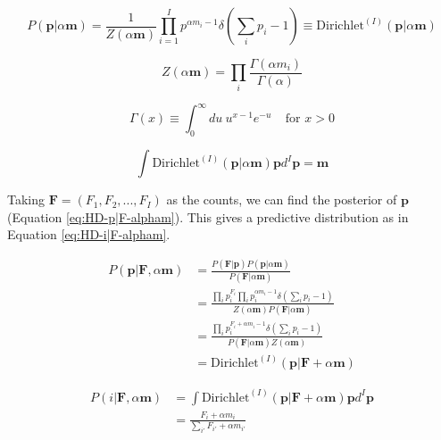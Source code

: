 \begin{equation}
P(\boldsymbol{p}|\alpha\boldsymbol{m})=\frac{1}{Z(\alpha\boldsymbol{m})}\prod_{i=1}^{I}p^{\alpha m_{i}-1}\delta\left(\sum_{i}p_{i}-1\right)\equiv \text{Dirichlet}^{(I)}(\boldsymbol{p}|\alpha\boldsymbol{m})
\label{eq:HD-Dir-p|alpha-m}
\end{equation}

\begin{equation}
Z(\alpha\boldsymbol{m})=\prod_{i}\frac{\Gamma(\alpha m_{i})}{\Gamma(\alpha)}
\label{eq:HD-Z}
\end{equation}

\begin{equation}
\Gamma(x)\equiv\int_{0}^{\infty}du\ u^{x-1}e^{-u} \ \ \ \ \ \text{for }x>0
\label{eq:HD-Gamma}
\end{equation}

\begin{equation}
\int\text{Dirichlet}^{(I)}(\boldsymbol{p}|\alpha\boldsymbol{m})\boldsymbol{p}d^{I}\boldsymbol{p}=\boldsymbol{m}
\label{eq:HD-DirMean}
\end{equation}

Taking $\boldsymbol{F}=(F_{1},F_{2},...,F_{I})$ as the counts, we can find the posterior of $\boldsymbol{p}$ (Equation \ref{eq:HD-p|F-alpham}). This gives a predictive distribution as in Equation \ref{eq:HD-i|F-alpham}.

\begin{align}
P(\boldsymbol{p}|\boldsymbol{F},\alpha\boldsymbol{m})&=\frac{P(\boldsymbol{F}|\boldsymbol{p})P(\boldsymbol{p}|\alpha\boldsymbol{m})}{P(\boldsymbol{F}|\alpha\boldsymbol{m})} \nonumber
\\
&=\frac{\prod_{i}p_{i}^{F_{i}}\prod_{i}p_{i}^{\alpha m_{i}-1}\delta(\sum_{i}p_{i}-1)}{Z(\alpha\boldsymbol{m})P(\boldsymbol{F}|\alpha\boldsymbol{m})} \nonumber
\\
&=\frac{\prod_{i}p_{i}^{F_{i}+\alpha m_{i}-1}\delta(\sum_{i}p_{i}-1)}{P(\boldsymbol{F}|\alpha\boldsymbol{m})Z(\alpha\boldsymbol{m})} \nonumber
\\
&=\text{Dirichlet}^{(I)}(\boldsymbol{p}|\boldsymbol{F}+\alpha\boldsymbol{m})
\label{eq:HD-p|F-alpham}
\end{align}

\begin{align}
P(i|\boldsymbol{F},\alpha\boldsymbol{m})&=\int\text{Dirichlet}^{(I)}(\boldsymbol{p}|\boldsymbol{F}+\alpha\boldsymbol{m})\boldsymbol{p}d^{I}\boldsymbol{p} \nonumber
\\
&=\frac{F_{i}+\alpha m_{i}}{\sum_{i'}F_{i'}+\alpha m_{i'}}
\label{eq:HD-i|F-alpham}
\end{align}

